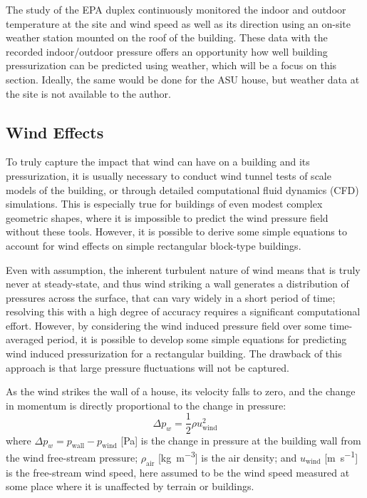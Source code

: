 The study of the EPA duplex continuously monitored the indoor and outdoor temperature at the site and wind speed as well as its direction using an on-site weather station mounted on the roof of the building.
These data with the recorded indoor/outdoor pressure offers an opportunity how well building pressurization can be predicted using weather, which will be a focus on this section.
Ideally, the same would be done for the ASU house, but weather data at the site is not available to the author.\par

\subsection{Wind Effects}

To truly capture the impact that wind can have on a building and its pressurization, it is usually necessary to conduct wind tunnel tests of scale models of the building, or through detailed computational fluid dynamics (CFD) simulations.
This is especially true for buildings of even modest complex geometric shapes, where it is impossible to predict the wind pressure field without these tools.
However, it is possible to derive some simple equations to account for wind effects on simple rectangular block-type buildings.\par

Even with assumption, the inherent turbulent nature of wind means that is truly never at steady-state, and thus wind striking a wall generates a distribution of pressures across the surface, that can vary widely in a short period of time; resolving this with a high degree of accuracy requires a significant computational effort.
However, by considering the wind induced pressure field over some time-averaged period, it is possible to develop some simple equations for predicting wind induced pressurization for a rectangular building.
The drawback of this approach is that large pressure fluctuations will not be captured.\par

As the wind strikes the wall of a house, its velocity falls to zero, and the change in momentum is directly proportional to the change in pressure:
\begin{equation}\label{eq:wind_pressure_uncorrected}
  \Delta p_w = \frac{1}{2} \rho u_\mathrm{wind}^2
\end{equation}
where $\Delta p_w = p_\mathrm{wall} - p_\mathrm{wind}$ [\si{\pascal}] is the change in pressure at the building wall from the wind free-stream pressure;
$\rho_\mathrm{air}$ [\si{\kilo\gram\per\metre\cubed}] is the air density;
and $u_\mathrm{wind}$ [\si{\metre\per\second}] is the free-stream wind speed, here assumed to be the wind speed measured at some place where it is unaffected by terrain or buildings.\par

